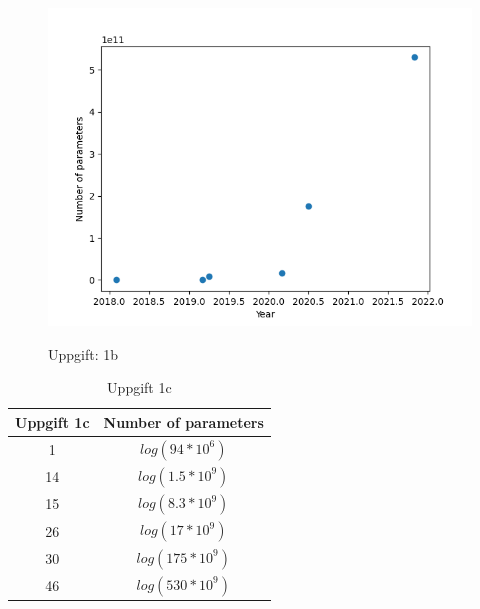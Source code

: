 \documentclass[a4paper]{article}
\begin{document}
            \begin{figure} [h]
                \includegraphics[width=\linewidth]{1b.png}
                \label{fig:rapport}    
                \caption{Uppgift: 1b}
            \end{figure}


            \begin{table} [h]
                \centering
                \caption{Uppgift 1c}
                \begin{tabular}{ | c | c |}
                    \hline
                    {\bf Uppgift 1c} & {\bf Number of parameters}  \\
                    \hline
                    1 & $log(94*10^6)$  \\
                    \hline
                    14 & $log(1.5*10^9)$  \\
                    \hline
                    15 & $log(8.3*10^9)$  \\
                    \hline
                    26 & $log(17*10^9)$  \\
                    \hline
                    30 & $log(175*10^9)$  \\
                    \hline
                    46 & $log(530*10^9)$  \\
                    \hline
                \end{tabular}
            \end{table}
        
\end{document}
